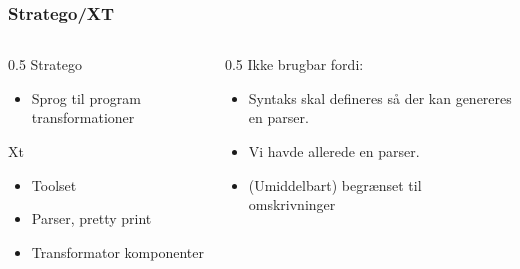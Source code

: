 \documentclass[slidestop,compress,mathserif, xcolor=dvipsnames]{beamer}
\begin{document}
\begin{frame}[c]
  \frametitle{Stratego/XT}

  \begin{columns}    
    \begin{column}{0.5\textwidth{}}
      Stratego
      \begin{itemize}
      \item Sprog til program transformationer
      \end{itemize}
      Xt 
      \begin{itemize}
      \item Toolset
      \item Parser, pretty print
      \item Transformator komponenter      
      \end{itemize}
    \end{column}
    \begin{column}{0.5\textwidth{}}
      Ikke brugbar fordi:
      \begin{itemize}
      \item Syntaks skal defineres så der kan genereres en parser.

      \item Vi havde allerede en parser.

      \item (Umiddelbart) begrænset til omskrivninger
      \end{itemize}
    \end{column}

  \end{columns} 

\end{frame}
\end{document}
